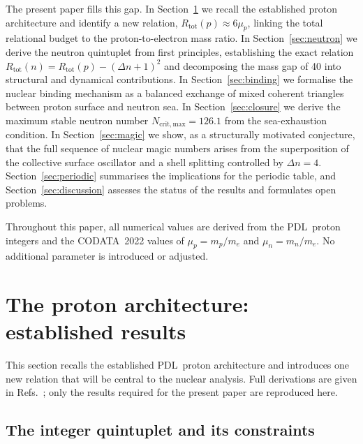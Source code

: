 \documentclass[11pt,a4paper]{article}
\theoremstyle{definition}
\newcommand{\PDL}{\textnormal{PDL}}
\newcommand{\Rtot}{R_{\mathrm{tot}}}
\begin{document}
The present paper fills this gap. In Section~\ref{sec:proton} we recall the established proton architecture and identify a new relation, $\Rtot(p) \approx 6\mu_p$, linking the total relational budget to the proton-to-electron mass ratio. In Section~\ref{sec:neutron} we derive the neutron quintuplet from first principles, establishing the exact relation $\Rtot(n) = \Rtot(p) - (\Delta n + 1)^2$ and decomposing the mass gap of 40 into structural and dynamical contributions. In Section~\ref{sec:binding} we formalise the nuclear binding mechanism as a balanced exchange of mixed coherent triangles between proton surface and neutron sea. In Section~\ref{sec:closure} we derive the maximum stable neutron number $N_{\mathrm{crit,max}} = 126.1$ from the sea-exhaustion condition. In Section~\ref{sec:magic} we show, as a structurally motivated conjecture, that the full sequence of nuclear magic numbers arises from the superposition of the collective surface oscillator and a shell splitting controlled by $\Delta n = 4$. Section~\ref{sec:periodic} summarises the implications for the periodic table, and Section~\ref{sec:discussion} assesses the status of the results and formulates open problems.

Throughout this paper, all numerical values are derived from the \PDL\ proton integers and the CODATA~2022 values of $\mu_p = m_p/m_e$ and $\mu_n = m_n/m_e$.\cite{CODATA_2022} No additional parameter is introduced or adjusted.

\section{The proton architecture: established results}
\label{sec:proton}

This section recalls the established \PDL\ proton architecture and introduces one new relation that will be central to the nuclear analysis. Full derivations are given in Refs.~\cite{PDL_Main_2026,Combinatorial_Proton_v2_2026,Alpha_PDL_v2_2026}; only the results required for the present paper are reproduced here.

\subsection{The integer quintuplet and its constraints}
\label{subsec:proton_integers}
\end{document}
